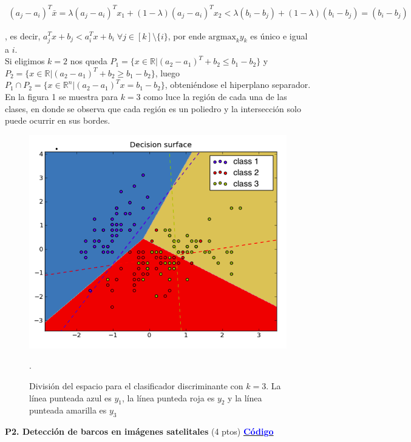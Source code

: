 \documentclass[11pt,letterpaper]{article}
\begin{document}
 \begin{align*}
     (a_{j}-a_{i})^{T}\bar{x} = \lambda(a_{j}-a_{i})^{T}x_{1}+(1-\lambda)(a_{j}-a_{i})^{T}x_{2} < \lambda(b_{i}-b_{j})+(1-\lambda)(b_{i}-b_{j}) = (b_{i}-b_{j})
 \end{align*}

, es decir, $a_{j}^{T}x+b_{j}<a_{i}^{T}x+b_{i} \; \forall j \in [k]\setminus\{i\}$, por ende $\text{argmax}_{k}y_{k}$ es único e igual a $i$.\\

Si eligimos $k=2$ nos queda $P_{1} = \{x\in \mathbb{R}|(a_{2}-a_{1})^{T}+b_{2}\leq b_{1}-b_{2}\}$ y $P_{2} = \{x\in \mathbb{R}|(a_{2}-a_{1})^{T}+b_{2}\geq b_{1}-b_{2}\}$, luego $P_{1}\cap P_{2}=\{x\in \mathbb{R}^{n}|(a_{2}-a_{1})^{T}x=b_{1}-b_{2}\}$, obteniéndose el hiperplano separador. En la figura 1 se muestra para $k=3$ como luce la región de cada una de las clases, en donde se observa que cada región es un poliedro y la intersección solo puede ocurrir en sus bordes.

\begin{figure}[H]
    \center
    \includegraphics[scale=0.4]{multiclass.png}
    \caption{División del espacio para el clasificador discriminante con $k=3$. La línea punteada azul es $y_{1}$, la línea punteda roja es $y_{2}$ y la línea punteada amarilla es $y_{3}$}.
\end{figure}


\newpage
\noindent\textbf{P2. Detección de barcos en imágenes satelitales} (4 ptos) \href{https://nbviewer.jupyter.org/github/dgarridoa/T3ML/blob/master/solucion.ipynb}{\textcolor{blue}{\textbf{Código}}}
\vspace{5mm}
\end{document}
